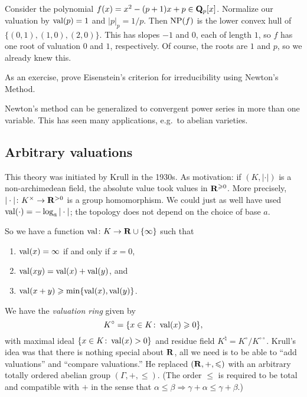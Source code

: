\begin{example}
Consider the polynomial $f(x)=x^2-(p+1)x+p\in \mathbf{Q}_p[x]$. Normalize our 
valuation by $\operatorname{val}(p)=1$ and $|p|_p=1/p$. Then $\operatorname{NP}(f)$ is the 
lower convex hull of $\{(0,1),(1,0),(2,0)\}$. This has slopes $-1$ and $0$, 
each of length $1$, so $f$ has one root of valuation $0$ and $1$, respectively. 
Of course, the roots are $1$ and $p$, so we already knew this. 
\end{example}

As an exercise, prove Eisenstein's criterion for irreducibility using Newton's 
Method. 

Newton's method can be generalized to convergent power series in more than one 
variable. This has seen many applications, e.g.~to abelian varieties. 





\subsection{Arbitrary valuations}

This theory was initiated by Krull in the 1930s. As motivation: if 
$(K,|\cdot|)$ is a non-archimedean field, the absolute value took values in 
$\mathbf{R}^{\geqslant 0}$. More precisely, $|\cdot|\colon K^\times \to \mathbf{R}^{>0}$ is 
a group homomorphism. We could just as well have used 
$\operatorname{val}(\cdot)=-\log_a|\cdot|$; the topology does not depend on the choice 
of base $a$. 

So we have a function $\operatorname{val}\colon K \to \mathbf{R}\cup\{\infty\}$ such that 
\begin{enumerate}
\item
$\operatorname{val}(x)=\infty$ if and only if $x=0$, 

\item
$\operatorname{val}(x y) = \operatorname{val}(x)+\operatorname{val}(y)$, and 

\item
$\operatorname{val}(x+y)\geqslant \min\{\operatorname{val}(x),\operatorname{val}(y)\}$. 
\end{enumerate}
We have the \emph{valuation ring} given by 
\[
  K^\circ = \{x\in K\colon \operatorname{val}(x) \geqslant 0\} ,
\]
with maximal ideal $\{x\in K\colon \operatorname{val}(x)>0\}$ and residue field 
$K^\natural=K^\circ/K^{\circ\circ}$. Krull's idea was that there is nothing 
special about $\mathbf{R}$, all we need is to be able to ``add valuations'' and 
``compare valuations.'' He replaced $(\mathbf{R},+,\leqslant)$ with an arbitrary 
totally ordered abelian group $(\Gamma,+,\leqslant)$. (The order $\leqslant$ is 
required to be total and compatible with $+$ in the sense that 
$\alpha\leqslant\beta\Rightarrow\gamma+\alpha\leqslant \gamma+\beta$.)

